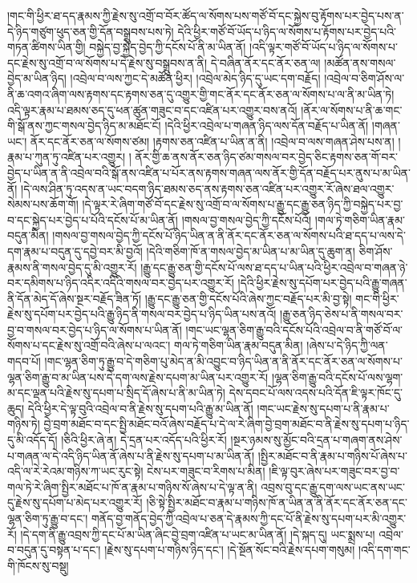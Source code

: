 །གང་གི་ཕྱིར་ཐ་དད་རྣམས་ཀྱི་རྗེས་སུ་འགྲོ་བ་བོར་ཚོད་ལ་སོགས་པས་གཙོ་བོ་དང་སྐྱེས་བུ་རྟོགས་པར་བྱེད་པས་ན་དེ་ཉིད་གཙུག་ཕུད་ཅན་གྱི་དོན་བསྒྲུབས་པས་ཏེ། དེའི་ཕྱིར་གཙོ་བོ་ཡོད་པ་ཉིད་ལ་སོགས་པ་རྟོགས་པར་བྱེད་པའི་གཏན་ཚིགས་ཡིན་གྱི། བསྐྱེད་བྱ་སྐྱེད་བྱེད་ཀྱི་དངོས་པོ་ནི་མ་ཡིན་ནོ། །འདི་ལྟར་གཙོ་བོ་ཡོད་པ་ཉིད་ལ་སོགས་པ་དང་རྗེས་སུ་འགྲོ་བ་ལ་སོགས་པ་དེ་རྗེས་སུ་བསྒྲུབས་ན་ནི། དེ་བཞིན་ནོར་དང་ནོར་ཅན་ལ། །མཚོན་ནས་གསལ་བྱེད་མ་ཡིན་ཉིད། །འབྲེལ་བ་ལས་ཀྱང་དེ་མཚོན་ཕྱིར། །འབྲེལ་མེད་ཉིད་དུ་ཡང་དག་བརྗོད། །འབྲེལ་བ་ཅིག་ཤོས་ལ་ནི་ཆ་འགའ་ཞིག་ལས་རྟགས་དང་རྟགས་ཅན་དུ་འགྱུར་གྱི་གང་ནོར་དང་ནོར་ཅན་ལ་སོགས་པ་ལ་ནི་མ་ཡིན་ཏེ། འདི་ལྟར་རྣམ་པ་ཐམས་ཅད་དུ་ཕན་ཚུན་གཟུང་བ་དང་འཛིན་པར་འགྱུར་བས་ནའོ། །ནོར་ལ་སོགས་པ་ནི་ཆ་གང་གི་སྒོ་ནས་ཀྱང་གསལ་བྱེད་ཉིད་མ་མཐོང་ངོ། །དེའི་ཕྱིར་འབྲེལ་པ་གཞན་ཉིད་ལས་དོན་བརྗོད་པ་ཡིན་ནོ། །གཞན་ཡང་། ནོར་དང་ནོར་ཅན་ལ་སོགས་ཙམ། །རྟགས་ཅན་འཛིན་པ་ཡིན་ན་ནི། །འབྲེལ་བ་ལས་གཞན་ཤེས་པས་ན། །རྣམ་པ་ཀུན་ཏུ་འཛིན་པར་འགྱུར། །
ནོར་གྱི་ཆ་ནས་ནོར་ཅན་ཉིད་ཙམ་གསལ་བར་བྱེད་ཅིང་རྟགས་ཅན་གོ་བར་བྱེད་པ་ཡིན་ན་ནི་འབྲེལ་བའི་སྒོ་ནས་འཛིན་པ་པོར་ནས་རྟགས་གཞན་ལས་ནོར་གྱི་དོན་བརྗོད་པར་ནུས་པ་མ་ཡིན་ནོ། །དེ་ལས་ཤིན་ཏུ་འདས་ན་ཡང་བདག་ཉིད་ཐམས་ཅད་ནས་རྟགས་ཅན་འཛིན་པར་འགྱུར་རོ་ཞེས་ཐལ་འགྱུར་སེམས་པས་ཆོག་གོ། །དེ་ལྟར་རེ་ཞིག་གཙོ་བོ་དང་རྗེས་སུ་འགྲོ་བ་ལ་སོགས་པ་རྒྱུ་དང་རྒྱུ་ཅན་ཉིད་ཀྱི་བསྐྱེད་པར་བྱ་བ་དང་སྐྱེད་པར་བྱེད་པ་པོའི་དངོས་པོ་མ་ཡིན་ནོ། །གསལ་བྱ་གསལ་བྱེད་ཀྱི་དངོས་པོའོ། །གལ་ཏེ་གཅིག་ཡིན་རྣམ་བདུན་མིན། །གསལ་བྱ་གསལ་བྱེད་ཀྱི་དངོས་པོ་ཉིད་ཡིན་ན་ནི་ནོར་དང་ནོར་ཅན་ལ་སོགས་པའི་ཐ་དད་པ་ལས་དེ་དག་རྣམ་པ་བདུན་དུ་དབྱེ་བར་མི་བྱའོ། །དེའི་གཅིག་ཁོ་ན་གསལ་བྱེད་མ་ཡིན་པ་མ་ཡིན་དུ་ཆུག་ན། ཅིག་ཤོས་རྣམས་ནི་གསལ་བྱེད་དུ་མི་འགྱུར་རོ། །རྒྱུ་དང་རྒྱུ་ཅན་གྱི་དངོས་པོ་ལས་ཐ་དད་པ་ཡིན་པའི་ཕྱིར་འབྲེལ་བ་གཞན་ཉེ་བར་དམིགས་པ་ཉིད་འདིར་འདིའི་གསལ་བར་བྱེད་པར་འགྱུར་རོ། །དེའི་ཕྱིར་རྗེས་སུ་དཔོག་པར་བྱེད་པའི་རྒྱུ་གཞན་ནི་དོན་མེད་དོ་ཞེས་སྔར་བརྗོད་ཟིན་ཏོ། །རྒྱུ་དང་རྒྱུ་ཅན་གྱི་དངོས་པོའི་ཞེས་ཀྱང་བརྗོད་པར་མི་བྱ་སྟེ། གང་གི་ཕྱིར་རྗེས་སུ་དཔོག་པར་བྱེད་པའི་རྒྱུ་ཉིད་ནི་གསལ་བར་བྱེད་པ་ཉིད་ཡིན་པས་ནའོ། །རྒྱུ་ཅན་ཉིད་ཅེས་པ་ནི་གསལ་བར་བྱ་བ་གསལ་བར་བྱེད་པ་ཉིད་ལ་སོགས་པ་ཡིན་ནོ། །གང་ཡང་ལྷན་ཅིག་རྒྱུ་བའི་དངོས་པོའི་འབྲེལ་བ་ནི་གཙོ་བོ་ལ་སོགས་པ་དང་རྗེས་སུ་འགྲོ་བའི་ཞེས་པ་ལའང་། གལ་ཏེ་གཅིག་ཡིན་རྣམ་བདུན་མིན། །ཞེས་པ་དེ་ཉིད་ཀྱི་ལན་གདབ་པོ། །གང་ལྷན་ཅིག་ཏུ་རྒྱུ་བ་དེ་གཅིག་པུ་མེད་ན་མི་འབྱུང་བ་ཉིད་ཡིན་ན་ནི་ནོར་དང་ནོར་ཅན་ལ་སོགས་པ་ལྷན་ཅིག་རྒྱུ་བ་མ་ཡིན་པས་དེ་དག་ལས་རྗེས་དཔག་མ་ཡིན་པར་འགྱུར་རོ། །ལྷན་ཅིག་རྒྱུ་བའི་དངོས་པོ་ལས་ལྷག་མ་དང་ལྡན་པའི་རྗེས་སུ་དཔག་པ་སྲིད་དོ་ཞེས་པ་ནི་མ་ཡིན་ཏེ། དེས་དབང་པོ་ལས་འདས་པའི་དོན་ཇི་ལྟར་ཁོང་དུ་ཆུད། དེའི་ཕྱིར་དེ་ལྟ་བུའི་འབྲེལ་བ་ནི་རྗེས་སུ་དཔག་པའི་རྒྱུ་མ་ཡིན་ནོ། །གང་ཡང་རྗེས་སུ་དཔག་པ་ནི་རྣམ་པ་གཉིས་ཏེ། བྱེ་བྲག་མཐོང་བ་དང་སྤྱི་མཐོང་བའོ་ཞེས་བརྗོད་པ་དེ་ལ་རེ་ཞིག་བྱེ་བྲག་མཐོང་བ་ནི་རྗེས་སུ་དཔག་པ་ཉིད་དུ་མི་འདོད་དོ། །ཅིའི་ཕྱིར་ཞེ་ན། དེ་དྲན་པར་འདོད་པའི་ཕྱིར་རོ། །སྔར་ཉམས་སུ་མྱོང་བའི་དྲན་པ་གཞག་ནས་ཤེས་པ་གཞན་ལ་དེ་འདི་ཉིད་ཡིན་ནོ་ཞེས་པ་ནི་རྗེས་སུ་དཔག་པ་མ་ཡིན་ནོ། །སྤྱིར་མཐོང་བ་ནི་རྣམ་པ་གཉིས་པོ་ཞེས་པ་འདི་ལ་རེ་རེའམ་གཉིས་ཀ་ཡང་རུང་སྟེ། ངེས་པར་གཟུང་བ་རིགས་པ་མིན། །ཇི་ལྟ་བུར་ཞེས་པར་གཟུང་བར་བྱ་བ་གལ་ཏེ་རེ་ཞིག་སྤྱིར་མཐོང་པ་ཁོ་ན་རྣམ་པ་གཉིས་སོ་ཞེས་པ་དེ་ལྟ་ན་ནི། འབྲས་བུ་དང་རྒྱུ་དག་ལས་ཡང་ནས་ཡང་དུ་རྗེས་སུ་དཔོག་པ་མེད་པར་འགྱུར་རོ། །ཅི་སྟེ་སྤྱིར་མཐོང་བ་རྣམ་པ་གཉིས་ཁོ་ན་ཡིན་ན་ནི་ནོར་དང་ནོར་ཅན་དང་ལྷན་ཅིག་ཏུ་རྒྱུ་བ་དང་། གནོད་བྱ་གནོད་བྱེད་ཀྱི་འབྲེལ་པ་ཅན་དེ་རྣམས་ཀྱི་དང་པོ་ནི་རྗེས་སུ་དཔག་པར་མི་འགྱུར་རོ། །དེ་དག་ནི་རྒྱུ་འབྲས་ཀྱི་དང་པོ་མ་ཡིན་ཞིང་བྱེ་བྲག་འཛིན་པ་ཡང་མ་ཡིན་ནོ། །དེ་སྐད་དུ། ཡང་སྨྲས་པ། འབྲེལ་བ་བདུན་དུ་བསྟན་པ་དང་། །རྗེས་སུ་དཔག་པ་གཉིས་ཉིད་དང་། །དེ་སྔོན་སོང་བའི་རྗེས་དཔག་གསུམ། །འདི་དག་གང་གི་ཁོངས་སུ་བསྡུ། 